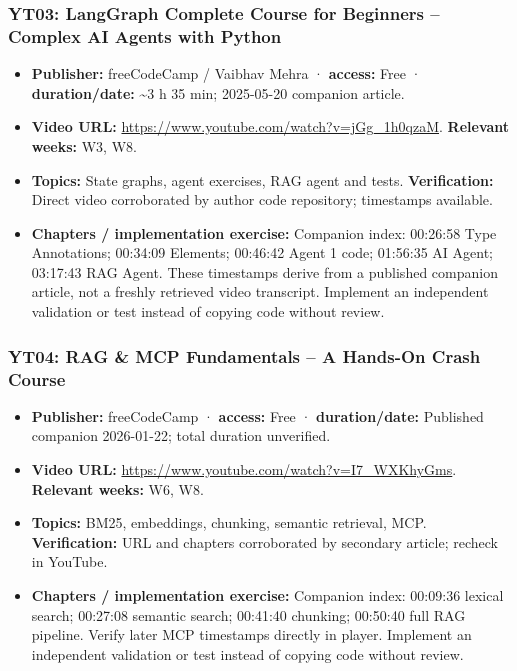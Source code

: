 \documentclass[
  10pt,
]{article}
\providecommand{\tightlist}{%
  \setlength{\itemsep}{0pt}\setlength{\parskip}{0pt}}
\begin{document}
\subsubsection{YT03: LangGraph Complete Course for Beginners -- Complex
AI Agents with
Python}\label{yt03-langgraph-complete-course-for-beginners-complex-ai-agents-with-python}

\begin{itemize}
\tightlist
\item
  \textbf{Publisher:} freeCodeCamp / Vaibhav Mehra · \textbf{access:}
  Free · \textbf{duration/date:} \textasciitilde3 h 35 min; 2025-05-20
  companion article.
\item
  \textbf{Video URL:} \url{https://www.youtube.com/watch?v=jGg_1h0qzaM}.
  \textbf{Relevant weeks:} W3, W8.
\item
  \textbf{Topics:} State graphs, agent exercises, RAG agent and tests.
  \textbf{Verification:} Direct video corroborated by author code
  repository; timestamps available.
\item
  \textbf{Chapters / implementation exercise:} Companion index: 00:26:58
  Type Annotations; 00:34:09 Elements; 00:46:42 Agent 1 code; 01:56:35
  AI Agent; 03:17:43 RAG Agent. These timestamps derive from a published
  companion article, not a freshly retrieved video transcript. Implement
  an independent validation or test instead of copying code without
  review.
\end{itemize}

\subsubsection{YT04: RAG \& MCP Fundamentals -- A Hands-On Crash
Course}\label{yt04-rag-mcp-fundamentals-a-hands-on-crash-course}

\begin{itemize}
\tightlist
\item
  \textbf{Publisher:} freeCodeCamp · \textbf{access:} Free ·
  \textbf{duration/date:} Published companion 2026-01-22; total duration
  unverified.
\item
  \textbf{Video URL:} \url{https://www.youtube.com/watch?v=I7_WXKhyGms}.
  \textbf{Relevant weeks:} W6, W8.
\item
  \textbf{Topics:} BM25, embeddings, chunking, semantic retrieval, MCP.
  \textbf{Verification:} URL and chapters corroborated by secondary
  article; recheck in YouTube.
\item
  \textbf{Chapters / implementation exercise:} Companion index: 00:09:36
  lexical search; 00:27:08 semantic search; 00:41:40 chunking; 00:50:40
  full RAG pipeline. Verify later MCP timestamps directly in player.
  Implement an independent validation or test instead of copying code
  without review.
\end{itemize}
\end{document}
